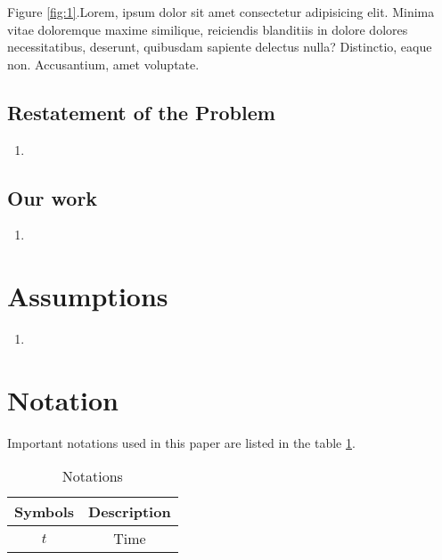 \documentclass[UTF8]{mcmthesis}
\begin{document}
            Figure \ref{fig:1}.Lorem, ipsum dolor sit amet consectetur adipisicing elit. Minima vitae doloremque maxime similique, reiciendis blanditiis in dolore dolores necessitatibus, deserunt, quibusdam sapiente delectus nulla? Distinctio, eaque non. Accusantium, amet voluptate. 


        \subsection{Restatement of the Problem}
            \begin{enumerate}
                \item 
            \end{enumerate}
        \subsection{Our work}
            \begin{enumerate}
                \item 
            \end{enumerate}
            

    \section{Assumptions}
        \begin{enumerate}
            \item 
        \end{enumerate}
        

    \section{Notation}
        \hspace*{2em}Important notations used in this paper are listed in the table \ref{tab:notations}.
        \vspace{-.5em}
        \begin{table}[htbp]
            \centering
            \caption{Notations}
            \vspace{0.5em}
            \begin{tabular}{cc}
                \toprule                %
                    \textbf{Symbols} & \textbf{Description} \\ 
                \midrule                %
                    $t$ & Time \\
                \bottomrule             %
            \end{tabular}
            \label{tab:notations}
        \end{table}
\end{document}

